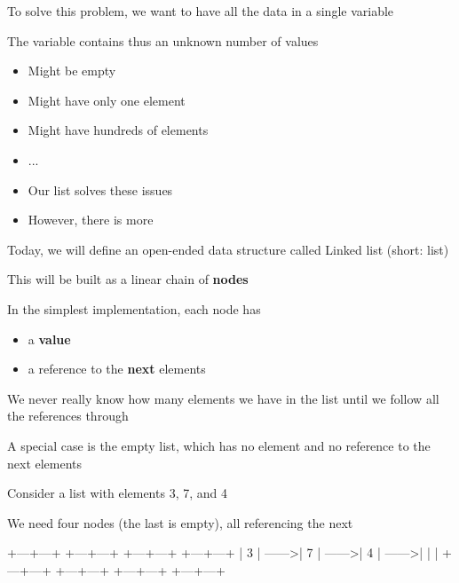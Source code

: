 \documentclass{beamer}
\begin{document}
\begin{slide}{
\item To solve this problem, we want to have all the data in a single variable
\item The variable contains thus an unknown number of values
\begin{itemize}
\item Might be empty
\item Might have only one element
\item Might have hundreds of elements
\item ...
\item Our list solves these issues
\item However, there is more
\end{itemize}
}\end{slide}

\begin{slide}{
\item Today, we will define an open-ended data structure called Linked list (short: list)
\item This will be built as a linear chain of \textbf{nodes}
\item In the simplest implementation, each node has
\begin{itemize}
\item a \textbf{value}
\item a reference to the \textbf{next} elements
\end{itemize}
\item We never really know how many elements we have in the list until we follow all the references through
\item A special case is the empty list, which has no element and no reference to the next elements
}\end{slide}

\begin{frame}[fragile]
\begin{codewithblock}{\item Consider a list with elements 3, 7, and 4 \item We need four nodes (the last is empty), all referencing the next}
+---+---+    +---+---+    +---+---+    +---+---+
| 3 | ------>| 7 | ------>| 4 | ------>|   |   |
+---+---+    +---+---+    +---+---+    +---+---+
\end{codewithblock}
\end{frame}
\end{document}
